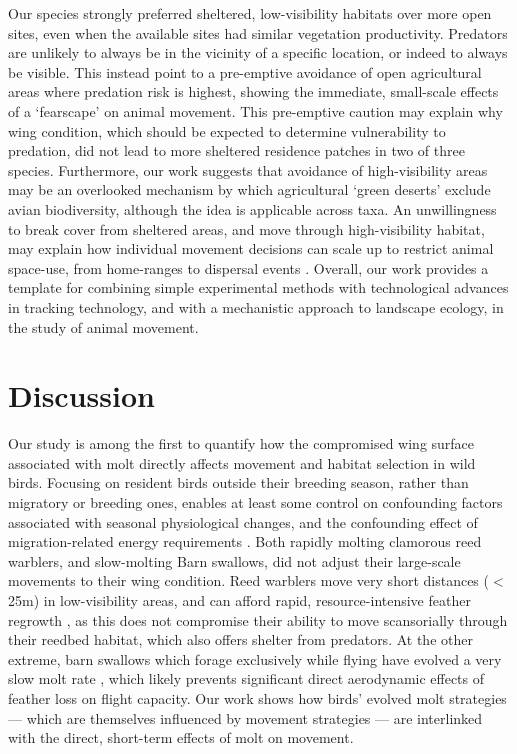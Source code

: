 \begin{refsection}
Our species strongly preferred sheltered, low-visibility habitats over more open sites, even when the available sites had similar vegetation productivity.
Predators are unlikely to always be in the vicinity of a specific location, or indeed to always be visible.
This instead point to a pre-emptive avoidance of open agricultural areas where predation risk is highest, showing the immediate, small-scale effects of a `fearscape' \cite{olsoy2015} on animal movement.
This pre-emptive caution may explain why wing condition, which should be expected to determine vulnerability to predation, did not lead to more sheltered residence patches in two of three species.
Furthermore, our work suggests that avoidance of high-visibility areas may be an overlooked mechanism by which agricultural `green deserts' exclude avian biodiversity, although the idea is applicable across taxa.
An unwillingness to break cover from sheltered areas, and move through high-visibility habitat, may explain how individual movement decisions can scale up to restrict animal space-use, from home-ranges to dispersal events \cite{schlagel2020}.
Overall, our work provides a template for combining simple experimental methods with technological advances in tracking technology, and with a mechanistic approach to landscape ecology, in the study of animal movement.

\section*{Discussion}

Our study is among the first to quantify how the compromised wing surface associated with molt directly affects movement and habitat selection in wild birds.
Focusing on resident birds outside their breeding season, rather than migratory or breeding ones, enables at least some control on confounding factors associated with seasonal physiological changes, and the confounding effect of migration-related energy requirements \cite{alerstam1990,wikelski2003,horvitz2014}.
Both rapidly molting clamorous reed warblers, and slow-molting Barn swallows, did not adjust their large-scale movements to their wing condition.
Reed warblers move very short distances ($<$ 25m) in low-visibility areas, and can afford rapid, resource-intensive feather regrowth \citep{lindstrom1993,newton2009,kiat2017}, as this does not compromise their ability to move scansorially through their reedbed habitat, which also offers shelter from predators.
At the other extreme, barn swallows which forage exclusively while flying have evolved a very slow molt rate \cite{kiat2016}, which likely prevents significant direct aerodynamic effects of feather loss on flight capacity.
Our work shows how birds' evolved molt strategies --- which are themselves influenced by movement strategies \cite{kiat2016} --- are interlinked with the direct, short-term effects of molt on movement.


\end{refsection}
